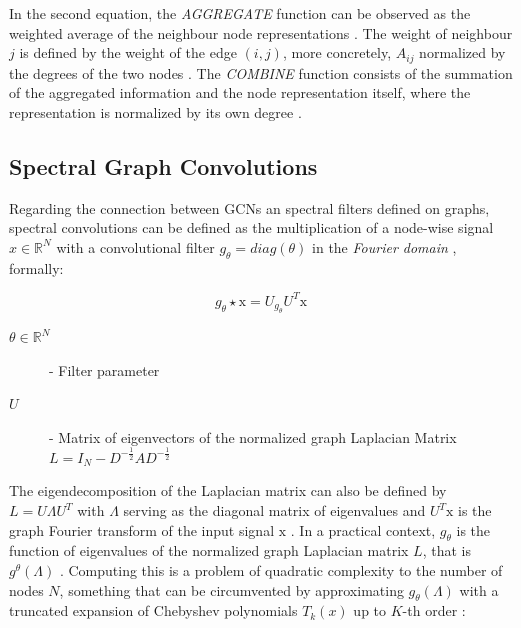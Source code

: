 In the second equation, the \textit{AGGREGATE} function can be observed as the weighted average of the neighbour node representations \cite{tangGraphNeuralNetworks2022}. The weight of neighbour $j$ is defined by the weight of the edge $(i,j)$, more concretely, $A_{ij}$ normalized by the degrees of the two nodes \cite{tangGraphNeuralNetworks2022}. The \textit{COMBINE} function consists of the summation of the aggregated information and the node representation itself, where the representation is normalized by its own degree \cite{tangGraphNeuralNetworks2022}.

\subsection*{Spectral Graph Convolutions}

Regarding the connection between GCNs an spectral filters defined on graphs, spectral convolutions can be defined as the multiplication of a node-wise signal $x \in \mathbb{R}^N$ with a convolutional filter $g_\theta = diag(\theta)$ in the \textit{Fourier domain} \cite{liuIntroductionGraphNeural2020, tangGraphNeuralNetworks2022}, formally:

\begin{equation}    
	g_\theta \star \text{x} = U_{g_\theta} U^T \text{x}
\end{equation}

\begin{description}
	\item[$\theta \in \mathbb{R}^N$] - Filter parameter
	\item[$U$] - Matrix of eigenvectors of the normalized graph Laplacian Matrix $L = I_N - D^{-\frac{1}{2}} AD^{-\frac{1}{2}}$
\end{description}

The eigendecomposition of the Laplacian matrix can also be defined by $L = U \Lambda U^T$ with $\Lambda$ serving as the diagonal matrix of eigenvalues and $U^T \text{x}$ is the graph Fourier transform of the input signal $\text{x}$ \cite{tangGraphNeuralNetworks2022}. In a practical context, $g_\theta$ is the function of eigenvalues of the normalized graph Laplacian matrix $L$, that is $g^\theta(\Lambda)$ \cite{liuIntroductionGraphNeural2020, tangGraphNeuralNetworks2022}. Computing this is a problem of quadratic complexity to the number of nodes $N$, something that can be circumvented by approximating $g_\theta (\Lambda)$ with a truncated expansion of Chebyshev polynomials $T_k(x)$ up to $K$-th order \cite{liuIntroductionGraphNeural2020, tangGraphNeuralNetworks2022}:


